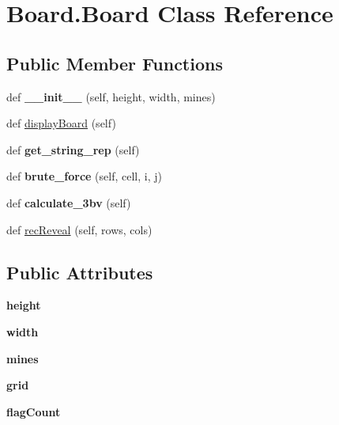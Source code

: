 \hypertarget{class_board_1_1_board}{}\section{Board.\+Board Class Reference}
\label{class_board_1_1_board}
\subsection*{Public Member Functions}
\begin{DoxyCompactItemize}
\item 
\mbox{\label{class_board_1_1_board_a64e3380089e1c6b86069eed8ef0a4cf9}} 
def {\bfseries \+\_\+\+\_\+init\+\_\+\+\_\+} (self, height, width, mines)
\item 
def \hyperlink{class_board_1_1_board_af52ea18259bf8d2a122de08fcb0ea308}{display\+Board} (self)
\item 
\mbox{\label{class_board_1_1_board_ac84e7c87ac2407614bf0e63f165a76d5}} 
def {\bfseries get\+\_\+string\+\_\+rep} (self)
\item 
\mbox{\label{class_board_1_1_board_a8b8e0d2e99c02de780604baa141159c3}} 
def {\bfseries brute\+\_\+force} (self, cell, i, j)
\item 
\mbox{\label{class_board_1_1_board_a9f3fd38d0abf01671f3d8bb0f3ceea5e}} 
def {\bfseries calculate\+\_\+3bv} (self)
\item 
def \hyperlink{class_board_1_1_board_a4a027666af1fa52582af6543985a73c6}{rec\+Reveal} (self, rows, cols)
\end{DoxyCompactItemize}
\subsection*{Public Attributes}
\begin{DoxyCompactItemize}
\item 
\mbox{\label{class_board_1_1_board_a288daa852b69c17ecbabab9af6dac15a}} 
{\bfseries height}
\item 
\mbox{\label{class_board_1_1_board_a354a175ae1f399098ac23ed37c58a3f2}} 
{\bfseries width}
\item 
\mbox{\label{class_board_1_1_board_a46a8a14d245c71600c5416deab063feb}} 
{\bfseries mines}
\item 
\mbox{\label{class_board_1_1_board_a29136b70f21697be0dcccb782d5ee5bf}} 
{\bfseries grid}
\item 
\mbox{\label{class_board_1_1_board_a404b2ee0a7cec1fe76688e1da26e4339}} 
{\bfseries flag\+Count}
\end{DoxyCompactItemize}


